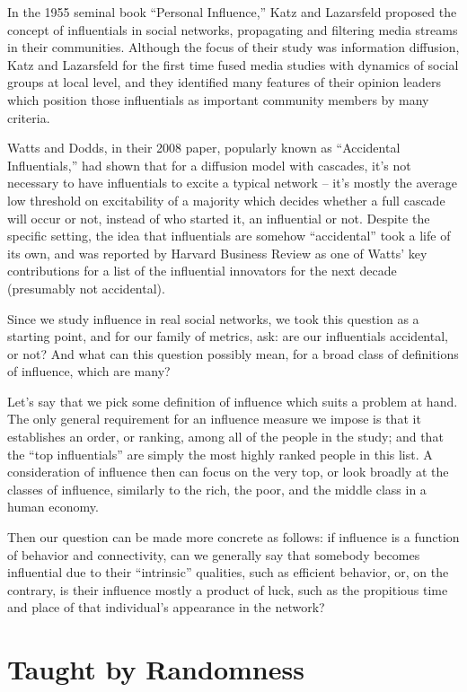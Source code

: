 \documentclass[10pt,oneside]{memoir}
\begin{document}
In the 1955 seminal book ``Personal Influence,'' Katz and Lazarsfeld proposed the concept of influentials in social networks, propagating and filtering media streams in their communities.  Although the focus of their study was information diffusion, Katz and Lazarsfeld for the first time fused media studies with dynamics of social groups at local level, and they identified many features of their opinion leaders which position those influentials as important community members by many criteria.


Watts and Dodds, in their 2008 paper, popularly known as ``Accidental Influentials,'' had shown that for a diffusion model with cascades, it's not necessary to have influentials to excite a typical network -- it's mostly the average low threshold on excitability of a majority which decides whether a full cascade will occur or not, instead of who started it, an influential or not.  Despite the specific setting, the idea that influentials are somehow ``accidental'' took a life of its own, and was reported by Harvard Business Review as one of Watts' key contributions for a list of the influential innovators for the next decade (presumably not accidental).


Since we study influence in real social networks, we took this question as a starting point, and for our family of metrics, ask: are our influentials accidental, or not?  And what can this question possibly mean, for a broad class of definitions of influence, which are many?


Let's say that we pick some definition of influence which suits a problem at hand.  The only general requirement for an influence measure we impose is that it establishes an order, or ranking, among all of the people in the study; and that the ``top influentials'' are simply the most highly ranked people in this list.  A consideration of influence then can focus on the very top, or look broadly at the classes of influence, similarly to the rich, the poor, and the middle class in a human economy.


Then our question can be made more concrete as follows: if influence is a function of behavior and connectivity, can we generally say that somebody becomes influential due to their ``intrinsic'' qualities, such as efficient behavior, or, on the contrary, is their influence mostly a product of luck, such as the propitious time and place of that individual's appearance in the network?


\section{Taught by Randomness}
\label{taughtbyrandomness}
\end{document}
